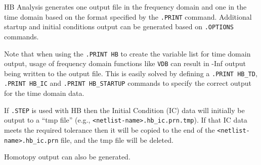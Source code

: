 

HB Analysis generates one output file in the frequency domain and one in the
time domain based on the format specified by the \texttt{.PRINT}
command.  Additional startup and initial conditions output can be
generated based on \texttt{.OPTIONS} commands.

Note that when using the \texttt{.PRINT HB} to create the variable list
for time domain output, usage of frequency domain functions like \texttt{VDB} can
result in -Inf output being written to the output file.  This is easily
solved by defining a \texttt{.PRINT HB\_TD}, \texttt{.PRINT HB\_IC} and
\texttt{.PRINT HB\_STARTUP} commands to specify the correct output for
the time domain data.

If \texttt{.STEP} is used with HB then the Initial Condition (IC) data will initially
be output to a ``tmp file'' (e.g., \texttt{<netlist-name>.hb\_ic.prn.tmp}).
If that IC data meets the required tolerance then it will be copied to the end
of the \texttt{<netlist-name>.hb\_ic.prn} file, and the tmp file will be deleted.

Homotopy output can also be generated.

